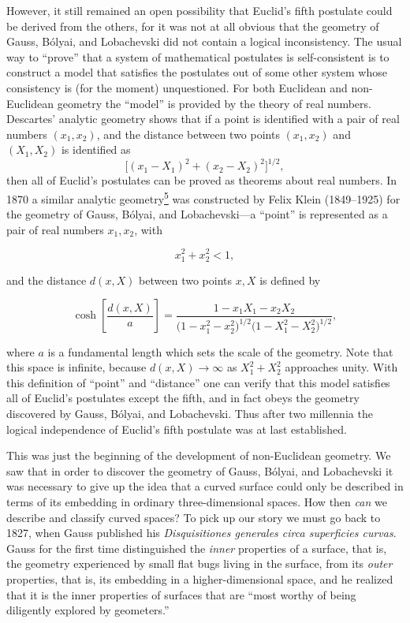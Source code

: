 However, it still remained an open possibility that Euclid's fifth postulate
could be derived from the others, for it was not at all obvious that the
geometry of Gauss, B\'olyai, and Lobachevski did not contain a logical
inconsistency. The usual way to ``prove'' that a system of mathematical
postulates is self-consistent is to construct a model that satisfies the
postulates out of some other system whose consistency is (for the moment)
unquestioned. For both Euclidean and non-Euclidean geometry the ``model'' is
provided by the theory of real numbers. Descartes' analytic geometry shows
that if a point is identified with a pair of real numbers \((x_1,x_2)\), and
the distance between two points \((x_1,x_2)\) and \((X_1,X_2)\) is identified
as
\[
  \bigl[(x_1-X_1)^2+(x_2-X_2)^2\bigr]^{1/2},
\]
then all of Euclid's postulates can be proved as theorems about real numbers.
In 1870 a similar analytic
geometry\hyperref[ch1-ref-5]{\textsuperscript{5}} was constructed by Felix
Klein (1849--1925) for the geometry of Gauss, B\'olyai, and Lobachevski---a
``point'' is represented as a pair of real numbers \(x_1,x_2\), with

\begin{equation}
  x_1^2+x_2^2<1,
  \tag{1.1.1}\label{eq:1.1.1}
\end{equation}

and the distance \(d(x,X)\) between two points \(x,X\) is defined by

\begin{equation}
  \cosh\!\left[\frac{d(x,X)}{a}\right]
  =
  \frac{1-x_1X_1-x_2X_2}
  {\bigl(1-x_1^2-x_2^2\bigr)^{1/2}
   \bigl(1-X_1^2-X_2^2\bigr)^{1/2}},
  \tag{1.1.2}\label{eq:1.1.2}
\end{equation}

where \(a\) is a fundamental length which sets the scale of the geometry.
Note that this space is infinite, because \(d(x,X)\to\infty\) as
\(X_1^2+X_2^2\) approaches unity. With this definition of ``point'' and
``distance'' one can verify that this model satisfies all of Euclid's
postulates except the fifth, and in fact obeys the geometry discovered by
Gauss, B\'olyai, and Lobachevski. Thus after two millennia the logical
independence of Euclid's fifth postulate was at last established.

This was just the beginning of the development of non-Euclidean geometry. We
saw that in order to discover the geometry of Gauss, B\'olyai, and
Lobachevski it was necessary to give up the idea that a curved surface could
only be described in terms of its embedding in ordinary three-dimensional
spaces. How then \emph{can} we describe and classify curved spaces? To pick up
our story we must go back to 1827, when Gauss published his
\emph{Disquisitiones generales circa superficies curvas}. Gauss for the first
time distinguished the \emph{inner} properties of a surface, that is, the
geometry experienced by small flat bugs living in the surface, from its
\emph{outer} properties, that is, its embedding in a higher-dimensional space,
and he realized that it is the inner properties of surfaces that are ``most
worthy of being diligently explored by geometers.''

